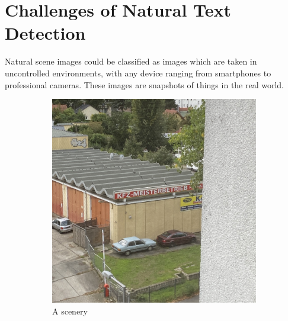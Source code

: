 \documentclass[a4paper]{article}
\begin{document}
\section{Challenges of Natural Text Detection} %
\label{sec:challenges}
Natural scene images could be classified as images which are taken in uncontrolled environments, with any device ranging from smartphones to professional cameras. These images are snapshots of things in the real world.
\begin{figure}[h!]
	\centering
	\begin{subfigure}[b]{0.4\linewidth}
	  \includegraphics[width=\linewidth]{img/sample2.jpeg}
	  \caption{A scenery}
	\end{subfigure}
	\begin{subfigure}[b]{0.4\linewidth}

\end{subfigure}
\end{figure}
\end{document}
